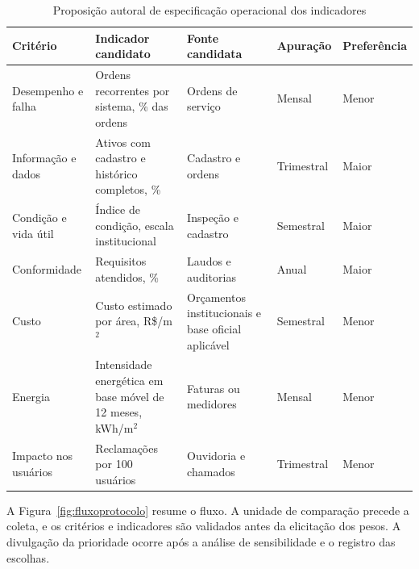 \begin{table}[htbp]
\centering
\caption{Proposição autoral de especificação operacional dos indicadores}
\label{tab:especificacaoindicadores}
\footnotesize
\begin{tabularx}{\textwidth}{>{\RaggedRight\arraybackslash}p{2.15cm} Y >{\RaggedRight\arraybackslash}p{2.3cm} >{\RaggedRight\arraybackslash}p{1.55cm} >{\RaggedRight\arraybackslash}p{1.7cm}}
\toprule
Critério & Indicador candidato & Fonte candidata & Apuração & Preferência \\
\midrule
Desempenho e falha & Ordens recorrentes por sistema, \% das ordens & Ordens de serviço & Mensal & Menor \\
Informação e dados & Ativos com cadastro e histórico completos, \% & Cadastro e ordens & Trimestral & Maior \\
Condição e vida útil & Índice de condição, escala institucional & Inspeção e cadastro & Semestral & Maior \\
Conformidade & Requisitos atendidos, \% & Laudos e auditorias & Anual & Maior \\
Custo & Custo estimado por área, R\$/m$^2$ & Orçamentos institucionais e base oficial aplicável & Semestral & Menor \\
Energia & Intensidade energética em base móvel de 12 meses, kWh/m$^2$ & Faturas ou medidores & Mensal & Menor \\
Impacto nos usuários & Reclamações por 100 usuários & Ouvidoria e chamados & Trimestral & Menor \\
\bottomrule
\end{tabularx}
\par{}
\end{table}

A Figura~\ref{fig:fluxoprotocolo} resume o fluxo. A unidade de comparação precede a coleta, e os critérios e indicadores são validados antes da elicitação dos pesos. A divulgação da prioridade ocorre após a análise de sensibilidade e o registro das escolhas.

